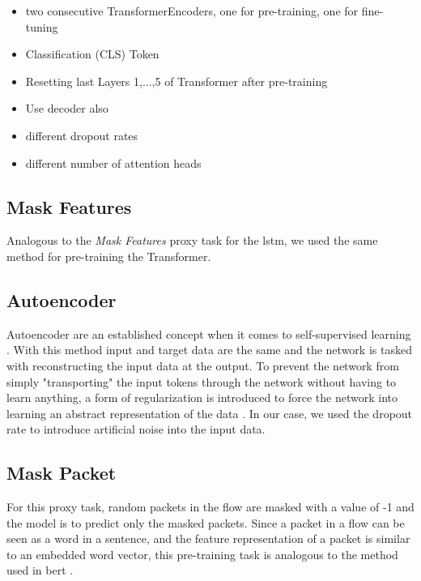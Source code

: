 
\begin{itemize}
	\item two consecutive TransformerEncoders, one for pre-training, one for fine-tuning
	\item Classification (CLS) Token
	\item Resetting last Layers 1,...,5 of Transformer after pre-training
	\item Use decoder also
	\item different dropout rates
	\item different number of attention heads
\end{itemize}

\subsection{Mask Features} \label{sec:experiments_transformer_mask_features}

Analogous to the \textit{Mask Features} proxy task for the \gls{lstm}, we used the same method for pre-training the Transformer.

\subsection{Autoencoder} \label{sec:experiments_transformer_autoencoder}

Autoencoder are an established concept when it comes to self-supervised learning . With this method input and target data are the same and the network is tasked with reconstructing the input data at the output. To prevent the network from simply "transporting" the input tokens through the network without having to learn anything, a form of regularization is introduced to force the network into learning an abstract representation of the data \cite{autoencoders}. 
In our case, we used the dropout rate to introduce artificial noise into the input data.

\subsection{Mask Packet}

For this proxy task, random packets in the flow are masked with a value of -1 and the model is to predict only the masked packets. Since a packet in a flow can be seen as a word in a sentence, and the feature representation of a packet is similar to an embedded word vector, this pre-training task is analogous to the method used in \gls{bert} \cite{bert}. 

\newpage
